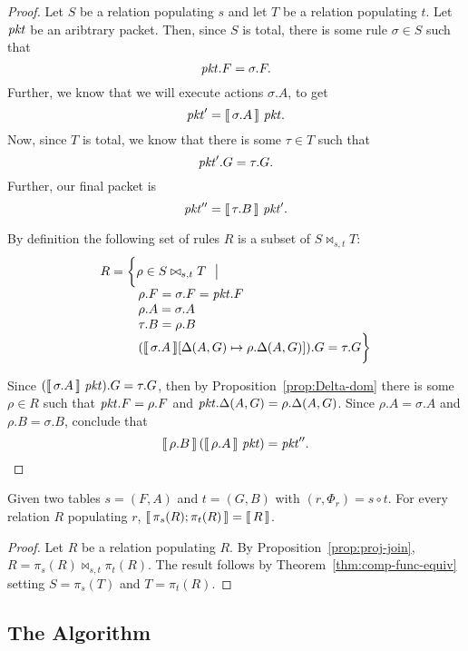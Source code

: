 \begin{proof}
  Let $S$ be a relation populating $s$ and let $T$ be a relation
  populating $t$.
  Let $\mathit{pkt}$ be an aribtrary packet. Then, since $S$ is total, there
  is some rule $\sigma \in S$ such that \[\mathit{pkt}.F = \sigma.F.\] Further, we
  know that we will execute actions $\sigma.A$, to get
  \[\mathit{pkt}' = \llbracket\,\sigma.A\,\rrbracket~\mathit{pkt}.\] Now, since $T$ is total, we know
  that there is some $\tau \in T$ such that \[\mathit{pkt}'.G = \tau.G.\]
  Further, our final packet is \[\mathit{pkt}'' = \llbracket\,\tau.B\,\rrbracket~\mathit{pkt}'.\]

  By definition the following set of rules $R$ is a subset of $S \bowtie_{s,t}T$:
  \[\begin{array}{l}
      R  = \bigg\{\rho \in S \bowtie_{s,t} T~~\big|\\
      \qquad\quad \rho.F = \sigma.F = \mathit{pkt}.F\\
      \qquad\quad \rho.A = \sigma.A \\
      \qquad\quad \tau.B = \rho.B \\
      \qquad\quad (\llbracket\,\sigma.A\,\rrbracket[\Delta(A,G) \mapsto \rho.\Delta(A,G)]).G =\tau.G \bigg\}
    \end{array}\]

  Since $(\llbracket\,\sigma.A\,\rrbracket~\mathit{pkt}).G = \tau.G$, then by
  Proposition~\ref{prop:Delta-dom} there is some $\rho \in R$ such
  that $\mathit{pkt}.F = \rho.F$ and $\mathit{pkt}.\Delta(A,G) =
  \rho.\Delta(A,G)$. Since $\rho.A = \sigma.A$ and
  $\rho.B = \sigma.B$, conclude that
  \[\llbracket\,\rho.B\,\rrbracket\left(\llbracket\,\rho.A\,\rrbracket~\mathit{pkt}\right) = \mathit{pkt}''.\]
\end{proof}


\begin{theorem}
  \label{thm:decomp-func-equiv}
  Given two tables $s = (F,A)$ and $t = (G,B)$ with
  $(r, \Phi_r) = s \circ t$. For every relation $R$ populating $r$, 
  $\llbracket\,\pi_s(R);\pi_t(R)\,\rrbracket = \llbracket\,R\,\rrbracket$.
\end{theorem}

\begin{proof}
  Let $R$ be a relation populating $R$. By
  Proposition~\ref{prop:proj-join},
  $R = \pi_s(R)\bowtie_{s,t}\pi_t(R)$. The result follows by
  Theorem~\ref{thm:comp-func-equiv} setting $S = \pi_s(T)$ and
  $T=\pi_t(R)$.
\end{proof}


\subsection{The Algorithm}

